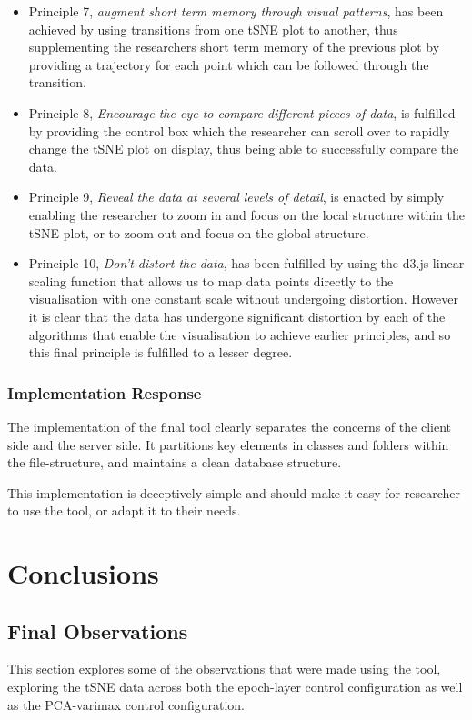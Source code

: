 \documentclass[a4paper,11pt,titlepage]{article}
\begin{document}
\begin{itemize}
		\item Principle 7, \textit{augment short term memory through visual patterns}, has been achieved by using transitions from one tSNE plot to another, thus supplementing the researchers short term memory of the previous plot by providing a trajectory for each point which can be followed through the transition.
		\item Principle 8, \textit{Encourage the eye to compare different pieces of data}, is fulfilled by providing the control box which the researcher can scroll over to rapidly change the tSNE plot on display, thus being able to successfully compare the data.
		\item Principle 9, \textit{Reveal the data at several levels of detail}, is enacted by simply enabling the researcher to zoom in and focus on the local structure within the tSNE plot, or to zoom out and focus on the global structure.
		\item Principle 10, \textit{Don't distort the data}, has been fulfilled by using the d3.js linear scaling function that allows us to map data points directly to the visualisation with one constant scale without undergoing distortion. However it is clear that the data has undergone significant distortion by each of the algorithms that enable the visualisation to achieve earlier principles, and so this final principle is fulfilled to a lesser degree.
	\end{itemize}
	
	\subsubsection{Implementation Response}
	The implementation of the final tool clearly separates the concerns of the client side and the server side. It partitions key elements in classes and folders within the file-structure, and maintains a clean database structure. 
	\par 
	This implementation is deceptively simple and should make it easy for researcher to use the tool, or adapt it to their needs.
	
\clearpage 

\section{Conclusions}
	
	\subsection{Final Observations}
	This section explores some of the observations that were made using the tool, exploring the tSNE data across both the epoch-layer control configuration as well as the PCA-varimax control configuration.
	
\end{document}
